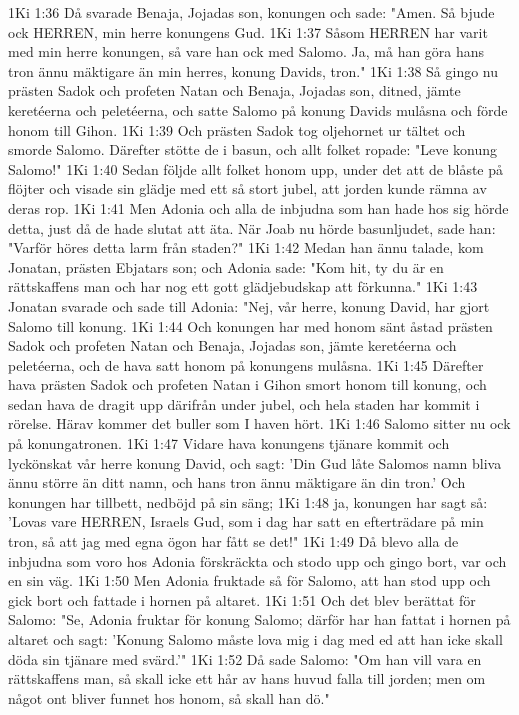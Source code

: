 1Ki 1:36  Då svarade Benaja, Jojadas son, konungen och sade: "Amen. Så bjude ock HERREN, min herre konungens Gud.
1Ki 1:37  Såsom HERREN har varit med min herre konungen, så vare han ock med Salomo. Ja, må han göra hans tron ännu mäktigare än min herres, konung Davids, tron."
1Ki 1:38  Så gingo nu prästen Sadok och profeten Natan och Benaja, Jojadas son, ditned, jämte keretéerna och peletéerna, och satte Salomo på konung Davids mulåsna och förde honom till Gihon.
1Ki 1:39  Och prästen Sadok tog oljehornet ur tältet och smorde Salomo. Därefter stötte de i basun, och allt folket ropade: "Leve konung Salomo!"
1Ki 1:40  Sedan följde allt folket honom upp, under det att de blåste på flöjter och visade sin glädje med ett så stort jubel, att jorden kunde rämna av deras rop.
1Ki 1:41  Men Adonia och alla de inbjudna som han hade hos sig hörde detta, just då de hade slutat att äta. När Joab nu hörde basunljudet, sade han: "Varför höres detta larm från staden?"
1Ki 1:42  Medan han ännu talade, kom Jonatan, prästen Ebjatars son; och Adonia sade: "Kom hit, ty du är en rättskaffens man och har nog ett gott glädjebudskap att förkunna."
1Ki 1:43  Jonatan svarade och sade till Adonia: "Nej, vår herre, konung David, har gjort Salomo till konung.
1Ki 1:44  Och konungen har med honom sänt åstad prästen Sadok och profeten Natan och Benaja, Jojadas son, jämte keretéerna och peletéerna, och de hava satt honom på konungens mulåsna.
1Ki 1:45  Därefter hava prästen Sadok och profeten Natan i Gihon smort honom till konung, och sedan hava de dragit upp därifrån under jubel, och hela staden har kommit i rörelse. Härav kommer det buller som I haven hört.
1Ki 1:46  Salomo sitter nu ock på konungatronen.
1Ki 1:47  Vidare hava konungens tjänare kommit och lyckönskat vår herre konung David, och sagt: 'Din Gud låte Salomos namn bliva ännu större än ditt namn, och hans tron ännu mäktigare än din tron.' Och konungen har tillbett, nedböjd på sin säng;
1Ki 1:48  ja, konungen har sagt så: 'Lovas vare HERREN, Israels Gud, som i dag har satt en efterträdare på min tron, så att jag med egna ögon har fått se det!"
1Ki 1:49  Då blevo alla de inbjudna som voro hos Adonia förskräckta och stodo upp och gingo bort, var och en sin väg.
1Ki 1:50  Men Adonia fruktade så för Salomo, att han stod upp och gick bort och fattade i hornen på altaret.
1Ki 1:51  Och det blev berättat för Salomo: "Se, Adonia fruktar för konung Salomo; därför har han fattat i hornen på altaret och sagt: 'Konung Salomo måste lova mig i dag med ed att han icke skall döda sin tjänare med svärd.'"
1Ki 1:52  Då sade Salomo: "Om han vill vara en rättskaffens man, så skall icke ett hår av hans huvud falla till jorden; men om något ont bliver funnet hos honom, så skall han dö."

